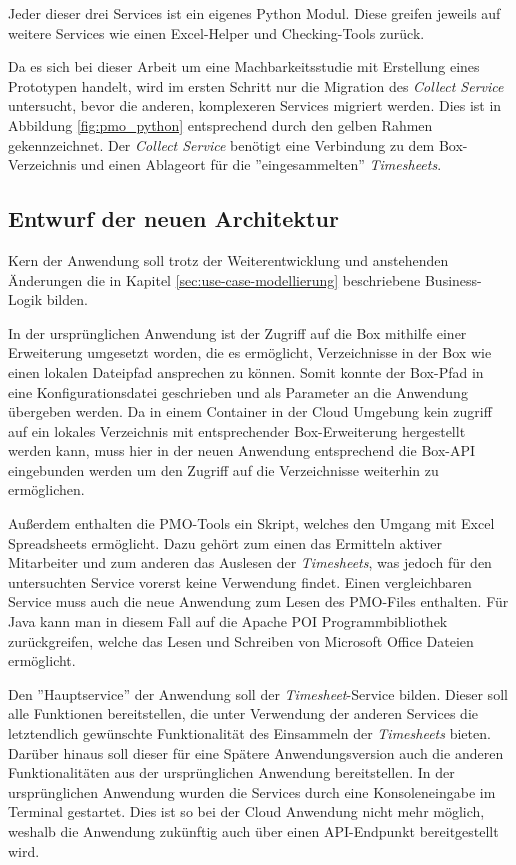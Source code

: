 Jeder dieser drei Services ist ein eigenes Python Modul. Diese greifen jeweils auf weitere Services wie einen Excel-Helper und Checking-Tools zurück.

Da es sich bei dieser Arbeit um eine Machbarkeitsstudie mit Erstellung eines Prototypen handelt, wird im ersten Schritt nur die Migration des \textit{Collect Service} untersucht, bevor die anderen, komplexeren Services migriert werden. Dies ist in Abbildung \ref{fig:pmo_python} entsprechend durch den gelben Rahmen gekennzeichnet. Der \textit{Collect Service} benötigt eine Verbindung zu dem \gls{Box}-Verzeichnis und einen Ablageort für die ''eingesammelten'' \textit{\glspl{Timesheet}}.
\pagebreak

\subsection{Entwurf der neuen Architektur}
Kern der Anwendung soll trotz der Weiterentwicklung und anstehenden Änderungen die in Kapitel \ref{sec:use-case-modellierung} beschriebene Business-Logik bilden.

In der ursprünglichen Anwendung ist der Zugriff auf die \gls{Box} mithilfe einer Erweiterung umgesetzt worden, die es ermöglicht, Verzeichnisse in der \gls{Box} wie einen lokalen Dateipfad ansprechen zu können. Somit konnte der Box-Pfad in eine Konfigurationsdatei geschrieben und als Parameter an die Anwendung übergeben werden. Da in einem Container in der Cloud Umgebung kein zugriff auf ein lokales Verzeichnis mit entsprechender \gls{Box}-Erweiterung hergestellt werden kann, muss hier in der neuen Anwendung entsprechend die \gls{Box}-\ac{API} eingebunden werden um den Zugriff auf die Verzeichnisse weiterhin zu ermöglichen.

Außerdem enthalten die PMO-Tools ein Skript, welches den Umgang mit Excel Spreadsheets ermöglicht. Dazu gehört zum einen das Ermitteln aktiver Mitarbeiter und zum anderen das Auslesen der \textit{\glspl{Timesheet}}, was jedoch für den untersuchten Service vorerst keine Verwendung findet. Einen vergleichbaren Service muss auch die neue Anwendung zum Lesen des PMO-Files enthalten. Für Java kann man in diesem Fall auf die Apache POI Programmbibliothek zurückgreifen, welche das Lesen und Schreiben von Microsoft Office Dateien ermöglicht.

Den ''Hauptservice'' der Anwendung soll der \textit{\gls{Timesheet}}-Service bilden. Dieser soll alle Funktionen bereitstellen, die unter Verwendung der anderen Services die letztendlich gewünschte Funktionalität des Einsammeln der \textit{\glspl{Timesheet}} bieten. Darüber hinaus soll dieser für eine Spätere Anwendungsversion auch die anderen Funktionalitäten aus der ursprünglichen Anwendung bereitstellen. In der ursprünglichen Anwendung wurden die Services durch eine Konsoleneingabe im Terminal gestartet. Dies ist so bei der Cloud Anwendung nicht mehr möglich, weshalb die Anwendung zukünftig auch über einen \ac{API}-Endpunkt bereitgestellt wird.

